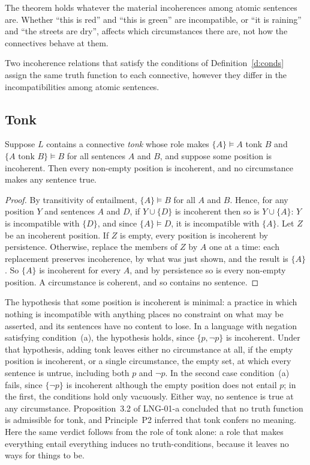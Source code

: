 \documentclass{situationist-preprint}
\begin{document}
The theorem holds whatever the material incoherences among atomic sentences are. Whether \enquote{this is red} and \enquote{this is green} are incompatible, or \enquote{it is raining} and \enquote{the streets are dry}, affects which circumstances there are, not how the connectives behave at them.

\begin{corollary}[Invariance]\label{c:inv}
Two incoherence relations that satisfy the conditions of Definition~\ref{d:conds} assign the same truth function to each connective, however they differ in the incompatibilities among atomic sentences.
\end{corollary}

\subsection{Tonk}

\begin{proposition}[Tonk]\label{p:tonk}
Suppose $L$ contains a connective \emph{tonk} whose role makes $\{A\} \models A$ tonk $B$ and $\{A \text{ tonk } B\} \models B$ for all sentences $A$ and $B$, and suppose some position is incoherent. Then every non-empty position is incoherent, and no circumstance makes any sentence true.
\end{proposition}

\begin{proof}
By transitivity of entailment, $\{A\} \models B$ for all $A$ and $B$. Hence, for any position $Y$ and sentences $A$ and $D$, if $Y \cup \{D\}$ is incoherent then so is $Y \cup \{A\}$: $Y$ is incompatible with $\{D\}$, and since $\{A\} \models D$, it is incompatible with $\{A\}$. Let $Z$ be an incoherent position. If $Z$ is empty, every position is incoherent by persistence. Otherwise, replace the members of $Z$ by $A$ one at a time: each replacement preserves incoherence, by what was just shown, and the result is $\{A\}$. So $\{A\}$ is incoherent for every $A$, and by persistence so is every non-empty position. A circumstance is coherent, and so contains no sentence.
\end{proof}

The hypothesis that some position is incoherent is minimal: a practice in which nothing is incompatible with anything places no constraint on what may be asserted, and its sentences have no content to lose. In a language with negation satisfying condition~(a), the hypothesis holds, since $\{p, \neg p\}$ is incoherent. Under that hypothesis, adding tonk leaves either no circumstance at all, if the empty position is incoherent, or a single circumstance, the empty set, at which every sentence is untrue, including both $p$ and $\neg p$. In the second case condition~(a) fails, since $\{\neg p\}$ is incoherent although the empty position does not entail $p$; in the first, the conditions hold only vacuously. Either way, no sentence is true at any circumstance. Proposition~3.2 of LNG-01-a concluded that no truth function is admissible for tonk, and Principle~P2 inferred that tonk confers no meaning. Here the same verdict follows from the role of tonk alone: a role that makes everything entail everything induces no truth-conditions, because it leaves no ways for things to be.
\end{document}
